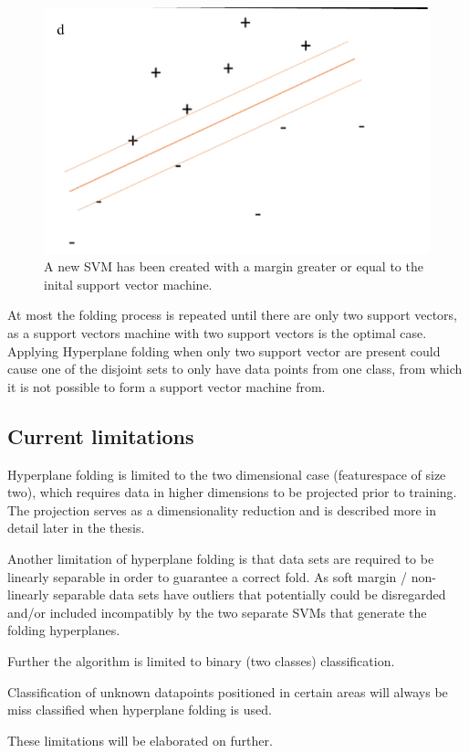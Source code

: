 \documentclass[a4paper,twoside]{bth}
\begin{document}
\begin{figure}
\centering
\includegraphics[scale=0.7]{images/intro-images/hpf_4.png}
   \caption{A new SVM has been created with a margin greater or equal to the inital support vector machine.}
   \label{hpf_4}
\end{figure}

\par At most the folding process is repeated until there are only two support vectors, as a support vectors machine with two support vectors is the optimal case. Applying Hyperplane folding when only two support vector are present could cause one of the disjoint sets to only have data points from one class, from which it is not possible to form a support vector machine from.

\subsection{Current limitations}
Hyperplane folding is limited to the two dimensional case (featurespace of size two), which requires data in higher dimensions to be projected prior to training. The projection serves as a dimensionality reduction and is described more in detail later in the thesis. 
\par Another limitation of hyperplane folding is that data sets are required to be linearly separable in order to guarantee a correct fold. As soft margin / non-linearly separable data sets have outliers that potentially could be disregarded and/or included incompatibly by the two separate SVMs that generate the folding hyperplanes.
\par Further the algorithm is limited to binary (two classes) classification.
\par Classification of unknown datapoints positioned in certain areas will always be miss classified when hyperplane folding is used.
\par These limitations will be elaborated on further.
\end{document}
